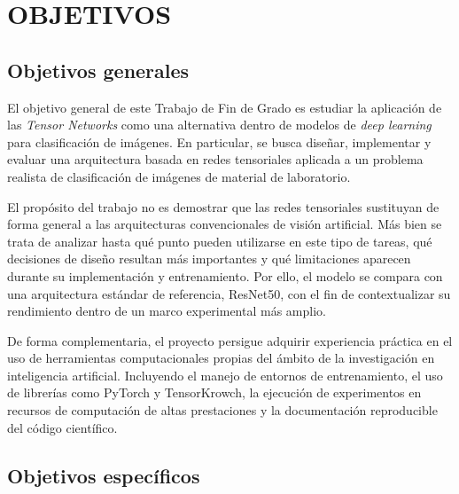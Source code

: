 \chapter{OBJETIVOS}\label{sec:Objetivos}

\section{Objetivos generales}
El objetivo general de este Trabajo de Fin de Grado es estudiar la aplicación de las \textit{Tensor Networks} como una alternativa dentro de modelos de \textit{deep learning} para clasificación de imágenes. En particular, se busca diseñar, implementar y evaluar una arquitectura basada en redes tensoriales aplicada a un problema realista de clasificación de imágenes de material de laboratorio.

El propósito del trabajo no es demostrar que las redes tensoriales sustituyan de forma general a las arquitecturas convencionales de visión artificial. Más bien se trata de analizar hasta qué punto pueden utilizarse en este tipo de tareas, qué decisiones de diseño resultan más importantes y qué limitaciones aparecen durante su implementación y entrenamiento. Por ello, el modelo se compara con una arquitectura estándar de referencia, ResNet50, con el fin de contextualizar su rendimiento dentro de un marco experimental más amplio.

De forma complementaria, el proyecto persigue adquirir experiencia práctica en el uso de herramientas computacionales propias del ámbito de la investigación en inteligencia artificial. Incluyendo el manejo de entornos de entrenamiento, el uso de librerías como PyTorch y TensorKrowch, la ejecución de experimentos en recursos de computación de altas prestaciones y la documentación reproducible del código científico.

\section{Objetivos específicos}

